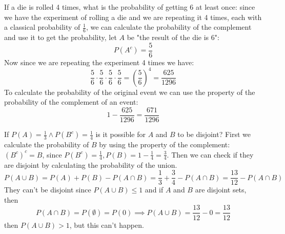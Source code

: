 \documentclass{article}
\begin{document}
    \begin{minipage}{\linewidth}
        \begin{solutions}
            If a die is rolled 4 times, what is the probability of getting 6 at least once: since we have the experiment of rolling a die and we are repeating it 4 times, each with a classical probability of $\frac{1}{6}$, we can calculate the probability of the complement and use it to get the probability, let $A$ be "the result of the die is 6":
            \[
                P(A^c) = \frac{5}{6} 
            \]
            Now since we are repeating the experiment 4 times we have: 
            \[
                \frac{5}{6}  \cdot \frac{5}{6} \cdot \frac{5}{6} \cdot \frac{5}{6} = (\frac{5}{6})^{4} = \frac{625}{1296}
            \]
            To calculate the probability of the original event we can use the property of the probability of the complement of an event:
            \[
                1 - \frac{625}{1296} = \frac{671}{1296}
            \]
            \medskip
        \end{solutions}   
    \end{minipage}
    \begin{minipage}{\linewidth}
        \begin{solutions}
            If $P(A) = \frac{1}{3} \land P(B^c) = \frac{1}{4}$ is it possible for $A$ and $B$ to be disjoint? First we calculate the probability of $B$ by using the property of the complement: $(B^c)^c = B$, since $P(B^c) = \frac{1}{4}, P(B) = 1 - \frac{1}{4} = \frac{3}{4}$. Then we can check if they are disjoint by calculating the probability of the union.
            \[
                P(A \cup B) = P(A) + P(B) - P(A \cap B) = \frac{1}{3} + \frac{3}{4} - P(A \cap B)= \frac{13}{12} - P(A \cap B) 
            \]
            They can't be disjoint since $P(A \cup B) \leq 1$ and if $A$ and $B$ are disjoint sets, then
            \[
                P(A \cap B) = P(\emptyset) = P(0) \implies P(A \cup B) = \frac{13}{12} - 0 = \frac{13}{12}
            \]
            then $P(A \cup B) > 1$, but this can't happen.
            \medskip           
        \end{solutions}
    \end{minipage}
\end{document}

